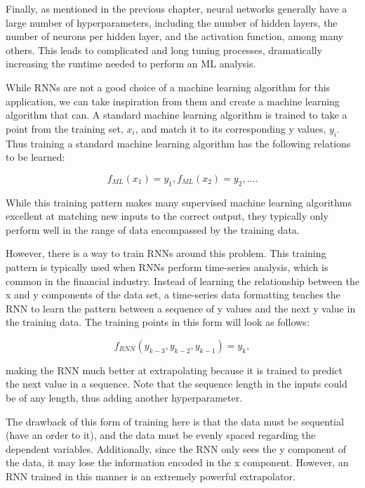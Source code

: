 Finally, as mentioned in the previous chapter, neural networks generally have a large number of hyperparameters, including the number of hidden layers, the number of neurons per hidden layer, and the activation function, among many others. This leads to complicated and long tuning processes, dramatically increasing the runtime needed to perform an ML analysis.

While RNNs are not a good choice of a machine learning algorithm for this application, we can take inspiration from them and create a machine learning algorithm that can. A standard machine learning algorithm is trained to take a point from the training set, $x_i$, and match it to its corresponding y values, $y_i$. Thus training a standard machine learning algorithm has the following relations to be learned:

\begin{equation}
    f_{ML}(x_1) = y_1, f_{ML}(x_2) = y_2, ... .
\end{equation}

While this training pattern makes many supervised machine learning algorithms excellent at matching new inputs to the correct output, they typically only perform well in the range of data encompassed by the training data.

However, there is a way to train RNNs around this problem. This training pattern is typically used when RNNs perform time-series analysis, which is common in the financial industry. Instead of learning the relationship between the x and y components of the data set, a time-series data formatting teaches the RNN to learn the pattern between a sequence of y values and the next y value in the training data. The training points in this form will look as follows:

\begin{equation}
    f_{RNN}(y_{k-3}, y_{k-2}, y_{k-1}) = y_k,
\end{equation}

making the RNN much better at extrapolating because it is trained to predict the next value in a sequence. Note that the sequence length in the inputs could be of any length, thus adding another hyperparameter.

The drawback of this form of training here is that the data must be sequential (have an order to it), and the data must be evenly spaced regarding the dependent variables. Additionally, since the RNN only sees the y component of the data, it may lose the information encoded in the x component. However, an RNN trained in this manner is an extremely powerful extrapolator.

